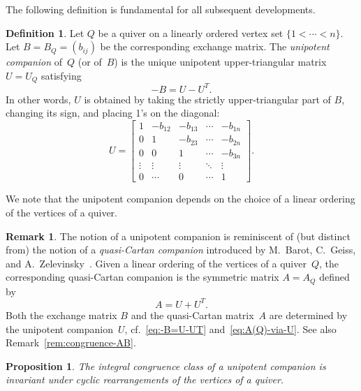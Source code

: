 \documentclass[11pt, letterpaper]{amsart}
\newtheorem{proposition}[theorem]{Proposition}
\theoremstyle{definition}
\newtheorem{remark}[theorem]{Remark}
\newtheorem{definition}[theorem]{Definition}
\numberwithin{equation}{section}
\begin{document}
The following definition is fundamental for all subsequent developments. 

\begin{definition} 
\label{def:unipotent companions}
Let $Q$ be a quiver on a linearly ordered vertex set $\{1<\cdots<n\}$. %
Let $B=B_Q=(b_{ij})$ be the corresponding exchange matrix. 
The \emph{unipotent companion} of~$Q$ (or of~$B$) is 
the unique unipotent upper-triangular matrix $U=U_Q$ satisfying 
\begin{equation}
\label{eq:-B=U-UT}
-B = U-U^T.
\end{equation}
In other words, $U$ is obtained by taking the strictly upper-triangular part of $B$, changing its sign, and placing 1's on the diagonal:
\begin{equation*}
U=\begin{bmatrix}
1 & -b_{12} & -b_{13} &\cdots  & -b_{1n} \\
0 & 1 & -b_{23} & \cdots  & -b_{2n} \\
0 & 0 & 1 & \cdots & -b_{3n}\\
\vdots & \vdots & \vdots & \ddots & \vdots  \\
0 & \cdots & 0 & \cdots & 1
\end{bmatrix}.
\end{equation*}

\end{definition}

We note that the unipotent companion depends on the choice of a linear ordering of the vertices of a quiver. 

\begin{remark}
\label{rem:U-vs-A}
The notion of a unipotent companion is reminiscent of (but distinct from) the notion of a 
\emph{quasi-Cartan companion} introduced by M.~Barot, C.~Geiss, and A.~Zelevinsky~\cite{BGZ}. 
Given a linear ordering of the vertices of a quiver~$Q$,
the corresponding quasi-Cartan companion 
is the symmetric matrix $A=A_Q$ defined by
\begin{equation}
\label{eq:A(Q)-via-U}
A=U+U^T. 
\end{equation}
Both the exchange matrix $B$ and the quasi-Cartan matrix~$A$ are determined by the unipotent companion~$U$,
cf.\ \eqref{eq:-B=U-UT} and~\eqref{eq:A(Q)-via-U}. 
See also Remark~\ref{rem:congruence-AB}. 
\end{remark}

\begin{proposition}
\label{prop:UQ cyclic shift congruent} 
The integral congruence class of a unipotent companion 
is invariant under cyclic rearrangements of the vertices of a quiver. 
\end{proposition}
\end{document}
